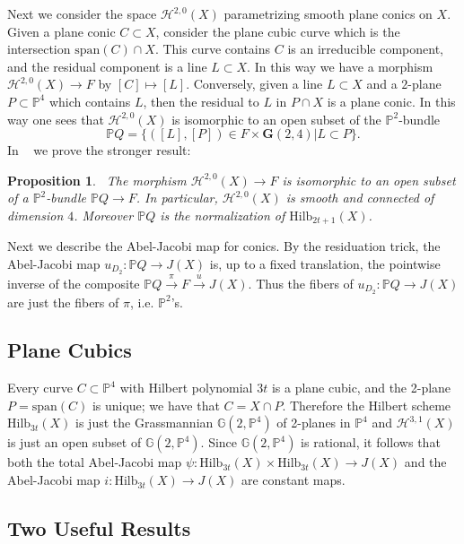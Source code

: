 \documentclass[amssymb,twoside,12 pt,amscd,reqno]{amsart}
\theoremstyle{plain}
\newtheorem{prop}[thm]{Proposition}
\theoremstyle{definition}
\newcommand{\Hdg}[2]{\mathcal{H}^{#1,#2}}
\newcommand{\PP}{\mathbb{P}}
\newcommand{\HI}[2]{\text{Hilb}_{#1}(#2)}
\begin{document}
Next we consider the space $\Hdg{2}{0}(X)$ parametrizing smooth plane
conics on $X$.  Given a plane conic $C\subset X$, consider the plane
cubic curve which is the intersection $\text{span}(C)\cap X$.  This
curve contains $C$ is an irreducible component, and the residual
component is a line $L\subset X$.  In this way we have a morphism
$\Hdg{2}{0}(X) \rightarrow F$ by $[C]\mapsto [L]$.  Conversely, given
a line $L\subset X$ and a $2$-plane $P\subset \PP^4$ which contains
$L$, then the residual to $L$ in $P\cap X$ is a plane conic.  In this
way one sees that $\Hdg{2}{0}(X)$ is isomorphic to an open subset of
the $\PP^2$-bundle
\begin{equation}
\PP Q = \{([L],[P])\in F\times \mathbf{G}(2,4) | L\subset P\}.
\end{equation}
In ~\cite[prop 3.4]{HRS1} we prove the stronger result:

\begin{prop}~\label{prop-cons1}  
The morphism
$\Hdg{2}{0}(X)\rightarrow F$ is isomorphic to an open subset of a
$\PP^2$-bundle $\PP Q\rightarrow F$.  In particular, $\Hdg{2}{0}(X)$
is smooth and connected of dimension $4$.  Moreover $\PP Q$ is the
normalization of $\HI{2t+1}{X}$.  
\end{prop}

Next we describe the Abel-Jacobi map for conics.  
By the residuation trick, the Abel-Jacobi map $u_{D_2}:\PP
Q\rightarrow J(X)$ is, up to a 
fixed translation, the pointwise inverse of the composite $\PP
Q\xrightarrow{\pi} F\xrightarrow{u} J(X)$.  Thus the fibers of
$u_{D_2}:\PP Q\rightarrow J(X)$ are just the fibers of $\pi$,
i.e. $\PP^2$'s.  


\subsection{Plane Cubics}\label{sec-pcubs}

Every curve $C\subset \PP^4$ with Hilbert polynomial $3t$ is a plane
cubic, and the 2-plane $P=\text{span}(C)$ is unique; we have
that $C=X\cap P$.  Therefore the Hilbert scheme $\HI{3t}{X}$ is just
the Grassmannian $\mathbb{G}(2,\PP^4)$ of 2-planes in $\PP^4$ and
$\Hdg{3}{1}(X)$ is just an open subset of $\mathbb{G}(2,\PP^4)$.    
Since
$\mathbb{G}(2,\PP^4)$ is rational, it follows that both the total Abel-Jacobi
map $\psi:\HI{3t}{X}\times \HI{3t}{X}\rightarrow J(X)$ and the
Abel-Jacobi map $i:\HI{3t}{X}\rightarrow J(X)$ are constant maps.  

\subsection{Two Useful Results}\label{sec-res}
\end{document}
